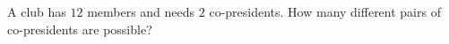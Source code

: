A club has $12$ members and needs $2$ co-presidents. How many different pairs of co-presidents are possible?

